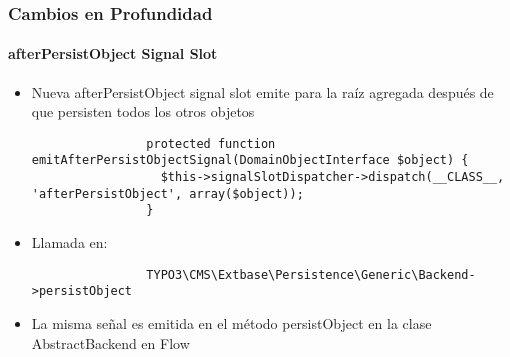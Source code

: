\begin{frame}[fragile]
	\frametitle{Cambios en Profundidad}
	\framesubtitle{afterPersistObject Signal Slot}

	\lstset{
		basicstyle=\tiny\ttfamily
	}

	\begin{itemize}

		\item Nueva afterPersistObject signal slot emite para la raíz agregada después de que persisten todos los otros objetos

			\begin{lstlisting}
				protected function emitAfterPersistObjectSignal(DomainObjectInterface $object) {
				  $this->signalSlotDispatcher->dispatch(__CLASS__, 'afterPersistObject', array($object));
				}
			\end{lstlisting}

		\item Llamada en:

			\begin{lstlisting}
				TYPO3\CMS\Extbase\Persistence\Generic\Backend->persistObject
			\end{lstlisting}

		\item La misma señal es emitida en el método persistObject en la clase AbstractBackend en Flow

	\end{itemize}

\end{frame}                                                 


